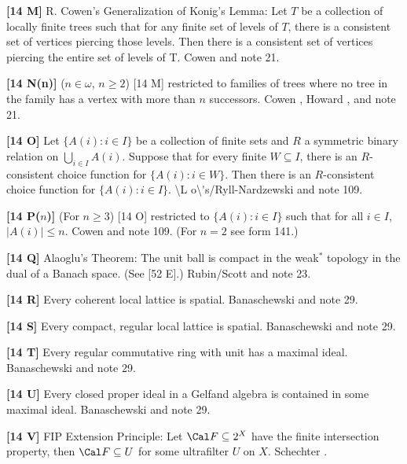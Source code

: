 \smallskip
\item{}{\bf [14 M]}  R. Cowen's Generalization of Konig's Lemma:  Let
$T$ be a collection of locally finite trees such that for any finite
set of levels of $T$, there is  a  consistent  set  of  vertices
piercing those levels.  Then there  is  a  consistent  set  of
vertices piercing the entire set of levels of T.  \ac{Cowen} \cite{1977b}
and note 21. 
\smallskip
\item{}{\bf [14 N(n)]} ($n\in\omega$, $n\ge 2$) [14 M] restricted
to families of trees where no tree in the family has a vertex with more
than $n$ successors.  \ac{Cowen} \cite{1977b}, \ac{Howard} \cite{1984a},
and note 21.
\smallskip
\item{}{\bf [14 O]}  Let $\{ A(i): i\in I\}$ be a collection of finite sets
and $R$ a symmetric binary relation on $\bigcup^{}_{i\in I}A(i)$. Suppose
that for every finite $W\subseteq I$, there is an $R$-consistent choice
function for $\{A(i): i\in W\}$.  Then there is an $R$-consistent choice
function for $\{A(i): i\in I\}$. \ac{\L o\'s/Ryll-Nardzewski} \cite{1951}
and note 109.
\smallskip
\item{}{\bf [14 P($n$)]} (For $n\ge 3$) [14 O] restricted to $\{A(i):
i\in I\}$ such that for all $i\in I$, $|A(i)|\le n$. \ac{Cowen}
\cite{1977b} and note 109. (For $n = 2$ see form 141.)
\smallskip
\item{}{\bf [14 Q]}  Alaoglu's Theorem:  The unit ball is compact in the
weak$^*$ topology in the dual of a Banach space.  (See [52 E].)
\ac{Rubin/Scott} \cite{1954} and note 23. 
\smallskip
\item{}{\bf [14 R]}  Every  coherent  local  lattice  is spatial.
\ac{Banaschewski} \cite{1981} and note 29.
\smallskip
\item{}{\bf [14 S]}  Every compact, regular local  lattice  is  spatial.
\ac{Banaschewski} \cite{1981} and note 29.
\smallskip
\item{}{\bf [14 T]}  Every regular commutative ring with unit has a
maximal ideal.  \ac{Banaschewski} \cite{1983} and note 29.
\smallskip
\item{}{\bf [14 U]}  Every closed proper ideal in a Gelfand algebra is
contained in some maximal ideal. \ac{Banaschewski} \cite{1983} and note 29.
\smallskip
\item{}{\bf [14 V]} FIP Extension Principle: Let ${\Cal F}\subseteq
2^{X}$  have the finite  intersection  property, then ${\Cal F}
\subseteq  U$  for   some ultrafilter $U$ on $X$.  \ac{Schechter}
\cite{1996a}.

